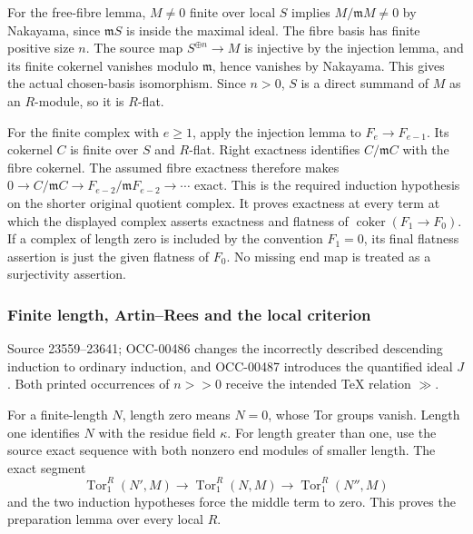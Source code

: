 For the free-fibre lemma, \(M\ne0\) finite over local \(S\) implies \(M/\mathfrak mM\ne0\) by Nakayama, since \(\mathfrak mS\) is inside the maximal ideal. The fibre basis has finite positive size \(n\). The source map \(S^{\oplus n}\to M\) is injective by the injection lemma, and its finite cokernel vanishes modulo \(\mathfrak m\), hence vanishes by Nakayama. This gives the actual chosen-basis isomorphism. Since \(n>0\), \(S\) is a direct summand of \(M\) as an \(R\)-module, so it is \(R\)-flat.

For the finite complex with \(e\geq1\), apply the injection lemma to \(F_e\to F_{e-1}\). Its cokernel \(C\) is finite over \(S\) and \(R\)-flat. Right exactness identifies \(C/\mathfrak mC\) with the fibre cokernel. The assumed fibre exactness therefore makes \(0\to C/\mathfrak mC\to F_{e-2}/\mathfrak mF_{e-2}\to\cdots\) exact. This is the required induction hypothesis on the shorter original quotient complex. It proves exactness at every term at which the displayed complex asserts exactness and flatness of \(\operatorname{coker}(F_1\to F_0)\). If a complex of length zero is included by the convention \(F_1=0\), its final flatness assertion is just the given flatness of \(F_0\). No missing end map is treated as a surjectivity assertion.

\subsubsection{Finite length, Artin--Rees and the local criterion}\label{algebra-proof-016-finite-length-artinrees-and-the-local-criterion}

Source 23559--23641; OCC-00486 changes the incorrectly described descending induction to ordinary induction, and OCC-00487 introduces the quantified ideal \(J\). Both printed occurrences of \(n>>0\) receive the intended TeX relation \(\gg\).

For a finite-length \(N\), length zero means \(N=0\), whose Tor groups vanish. Length one identifies \(N\) with the residue field \(\kappa\). For length greater than one, use the source exact sequence with both nonzero end modules of smaller length. The exact segment \[
\operatorname{Tor}_1^R(N',M)\longrightarrow
\operatorname{Tor}_1^R(N,M)\longrightarrow
\operatorname{Tor}_1^R(N'',M)
\] and the two induction hypotheses force the middle term to zero. This proves the preparation lemma over every local \(R\).

